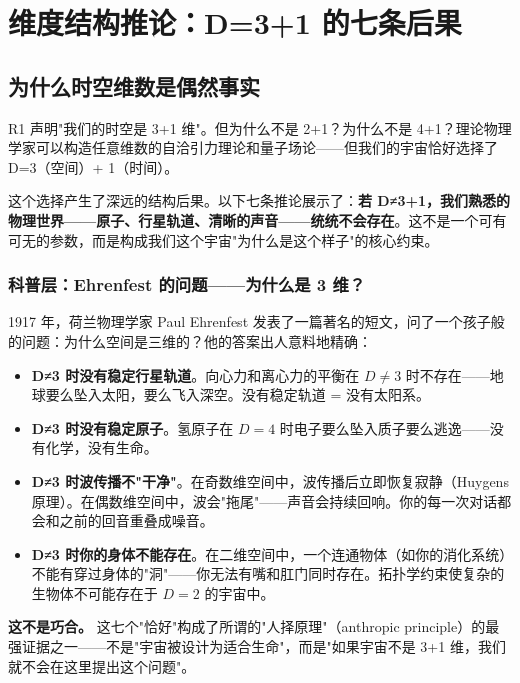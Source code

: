 \chapter{维度结构推论：D=3+1 的七条后果}
\label{ch:contingent}

\section*{为什么时空维数是偶然事实}

R1 声明"我们的时空是 3+1 维"。但为什么不是 2+1？为什么不是 4+1？理论物理学家可以构造任意维数的自洽引力理论和量子场论——但我们的宇宙恰好选择了 D=3（空间）+ 1（时间）。

这个选择产生了深远的结构后果。以下七条推论展示了：\textbf{若 D≠3+1，我们熟悉的物理世界——原子、行星轨道、清晰的声音——统统不会存在}。这不是一个可有可无的参数，而是构成我们这个宇宙"为什么是这个样子"的核心约束。

\subsection{科普层：Ehrenfest 的问题——为什么是 3 维？}

1917 年，荷兰物理学家 Paul Ehrenfest 发表了一篇著名的短文，问了一个孩子般的问题：为什么空间是三维的？他的答案出人意料地精确：

\begin{itemize}
\item \textbf{D≠3 时没有稳定行星轨道}。向心力和离心力的平衡在 $D\neq3$ 时不存在——地球要么坠入太阳，要么飞入深空。没有稳定轨道 = 没有太阳系。
\item \textbf{D≠3 时没有稳定原子}。氢原子在 $D=4$ 时电子要么坠入质子要么逃逸——没有化学，没有生命。
\item \textbf{D≠3 时波传播不"干净"}。在奇数维空间中，波传播后立即恢复寂静（Huygens 原理）。在偶数维空间中，波会"拖尾"——声音会持续回响。你的每一次对话都会和之前的回音重叠成噪音。
\item \textbf{D≠3 时你的身体不能存在}。在二维空间中，一个连通物体（如你的消化系统）不能有穿过身体的"洞"——你无法有嘴和肛门同时存在。拓扑学约束使复杂的生物体不可能存在于 $D=2$ 的宇宙中。
\end{itemize}

\textbf{这不是巧合。} 这七个"恰好"构成了所谓的"人择原理"（anthropic principle）的最强证据之一——不是"宇宙被设计为适合生命"，而是"如果宇宙不是 3+1 维，我们就不会在这里提出这个问题"。


